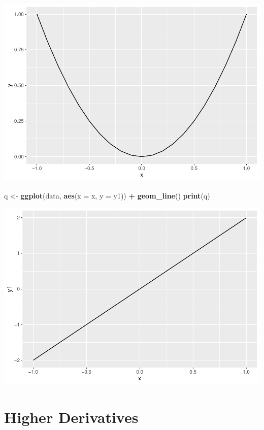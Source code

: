 \documentclass[]{book}
\newenvironment{Shaded}{\begin{snugshade}}{\end{snugshade}}
\newcommand{\DataTypeTok}[1]{\textcolor[rgb]{0.13,0.29,0.53}{#1}}
\newcommand{\KeywordTok}[1]{\textcolor[rgb]{0.13,0.29,0.53}{\textbf{#1}}}
\newcommand{\NormalTok}[1]{#1}
\newcommand{\OperatorTok}[1]{\textcolor[rgb]{0.81,0.36,0.00}{\textbf{#1}}}
\newcommand{\StringTok}[1]{\textcolor[rgb]{0.31,0.60,0.02}{#1}}
\begin{document}
\includegraphics{bookdown-demo_files/figure-latex/unnamed-chunk-7-1.pdf}

\begin{Shaded}
\begin{Highlighting}[]
\NormalTok{q <-}\StringTok{ }\KeywordTok{ggplot}\NormalTok{(data, }\KeywordTok{aes}\NormalTok{(}\DataTypeTok{x =}\NormalTok{ x, }\DataTypeTok{y =}\NormalTok{ y1)) }\OperatorTok{+}
\StringTok{  }\KeywordTok{geom_line}\NormalTok{()}
\KeywordTok{print}\NormalTok{(q)}
\end{Highlighting}
\end{Shaded}

\includegraphics{bookdown-demo_files/figure-latex/unnamed-chunk-8-1.pdf}

\hypertarget{higher-derivatives}{%
\section{Higher Derivatives}\label{higher-derivatives}}
\end{document}
